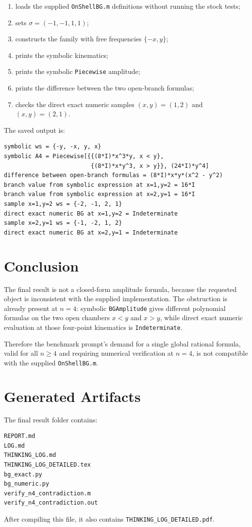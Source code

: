 \documentclass[11pt]{article}
\newcommand{\code}[1]{\texttt{#1}}
\begin{document}
\begin{enumerate}
  \item loads the supplied \code{OnShellBG.m} definitions without running the
        stock tests;
  \item sets \(\sigma=(-1,-1,1,1)\);
  \item constructs the family with free frequencies \(\{-x,y\}\);
  \item prints the symbolic kinematics;
  \item prints the symbolic \code{Piecewise} amplitude;
  \item prints the difference between the two open-branch formulas;
  \item checks the direct exact numeric samples \((x,y)=(1,2)\) and
        \((x,y)=(2,1)\).
\end{enumerate}

The saved output is:

\begin{Verbatim}[fontsize=\small]
symbolic ws = {-y, -x, y, x}
symbolic A4 = Piecewise[{{(8*I)*x^3*y, x < y},
                         {(8*I)*x*y^3, x > y}}, (24*I)*y^4]
difference between open-branch formulas = (8*I)*x*y*(x^2 - y^2)
branch value from symbolic expression at x=1,y=2 = 16*I
branch value from symbolic expression at x=2,y=1 = 16*I
sample x=1,y=2 ws = {-2, -1, 2, 1}
direct exact numeric BG at x=1,y=2 = Indeterminate
sample x=2,y=1 ws = {-1, -2, 1, 2}
direct exact numeric BG at x=2,y=1 = Indeterminate
\end{Verbatim}

\section{Conclusion}

The final result is not a closed-form amplitude formula, because the requested
object is inconsistent with the supplied implementation.  The obstruction is
already present at \(n=4\): symbolic \code{BGAmplitude} gives different
polynomial formulas on the two open chambers \(x<y\) and \(x>y\), while direct
exact numeric evaluation at those four-point kinematics is
\code{Indeterminate}.

Therefore the benchmark prompt's demand for a single global rational formula,
valid for all \(n\geq4\) and requiring numerical verification at \(n=4\), is
not compatible with the supplied \code{OnShellBG.m}.

\section{Generated Artifacts}

The final result folder contains:

\begin{Verbatim}[fontsize=\small]
REPORT.md
LOG.md
THINKING_LOG.md
THINKING_LOG_DETAILED.tex
bg_exact.py
bg_numeric.py
verify_n4_contradiction.m
verify_n4_contradiction.out
\end{Verbatim}

After compiling this file, it also contains
\code{THINKING\_LOG\_DETAILED.pdf}.
\end{document}
